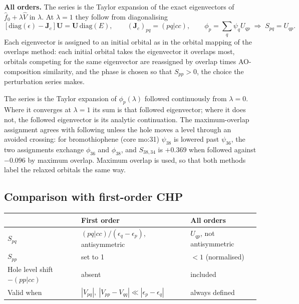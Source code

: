 \documentclass[11pt]{article}
\begin{document}
\textbf{All orders.} The series is the Taylor expansion of the exact eigenvectors of $\hat f_0 + \lambda\hat V$ in $\lambda$. At $\lambda=1$ they follow from diagonalising
\begin{equation}
  \boxed{\left[\mathrm{diag}(\epsilon) - \mathbf J_c\right]\mathbf U = \mathbf U\,\mathrm{diag}(E),
  \qquad (\mathbf J_c)_{pq} = (pq|cc),
  \qquad \phi_p = \sum_q \psi_q U_{qp}
  \;\Rightarrow\; S_{pq} = U_{qp}.}
\end{equation}
Each eigenvector is assigned to an initial orbital as in the orbital mapping of the overlaps method: each initial orbital takes the eigenvector it overlaps most, orbitals competing for the same eigenvector are reassigned by overlap times AO-composition similarity, and the phase is chosen so that $S_{pp}>0$, the choice the perturbation series makes.

The series is the Taylor expansion of $\phi_p(\lambda)$ followed continuously from $\lambda=0$. Where it converges at $\lambda=1$ its sum is that followed eigenvector; where it does not, the followed eigenvector is its analytic continuation. The maximum-overlap assignment agrees with following unless the hole moves a level through an avoided crossing: for bromothiophene (core mo:31) $\psi_{38}$ is lowered past $\psi_{36}$, the two assignments exchange $\phi_{36}$ and $\phi_{38}$, and $S_{38,34}$ is $+0.369$ when followed against $-0.096$ by maximum overlap. Maximum overlap is used, so that both methods label the relaxed orbitals the same way.

\subsection*{Comparison with first-order CHP}

\begin{center}
\begin{tabular}{lll}
\toprule
 & First order & All orders \\
\midrule
$S_{pq}$ & $(pq|cc)/(\epsilon_q-\epsilon_p)$, antisymmetric & $U_{qp}$, not antisymmetric \\
$S_{pp}$ & set to 1 & $<1$ (normalised) \\
Hole level shift $-(pp|cc)$ & absent & included \\
Valid when & $|V_{pq}|,\ |V_{pp}-V_{qq}| \ll |\epsilon_p-\epsilon_q|$ & always defined \\
\bottomrule
\end{tabular}
\end{center}
\end{document}
